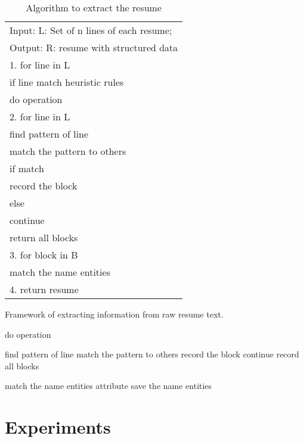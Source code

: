 \documentclass{acm_proc_article-sp}
\begin{document}
\begin{table}
\centering
\caption{Algorithm to extract the resume}
\begin{tabular}{|l|} \hline
Input: L: Set of n lines of each resume;\\
Output: R: resume with structured data \\ \hline
1. for line in L\\
	if line match heuristic rules\\
		do operation\\
2. for line in L\\
	find pattern of line\\
	match the pattern to others\\
	if match\\
		record the block\\
	else\\
		continue\\
	return all blocks\\
3. for block in B\\
	match the name entities\\
4. return resume\\
\hline
\end{tabular}
\end{table}


\begin{algorithm}[h] 

    \caption{Framework of extracting information from raw resume text.} 

    \begin{algorithmic}[1] 

				\STATE do operation
			\ENDIF
         \ENDFOR 

			\STATE find pattern of line
			\STATE match the pattern to others
				\STATE record the block
			\ELSE
				\STATE continue
			\ENDIF
         \ENDFOR 
		\STATE record all blocks

			\STATE match the name entities attribute
				\STATE save the name entities
			\ENDIF
         \ENDFOR 
                    

    \end{algorithmic}

\end{algorithm} 



\section{Experiments}\label{experiments}
\end{document}
